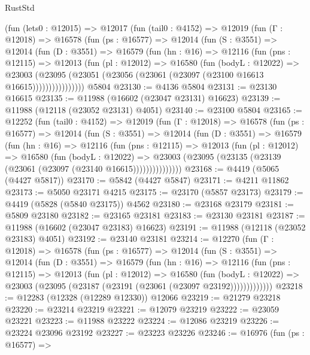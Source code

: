 \begin{lexlean}{RustStd}
\begin{coremodule}
    (fun (lets0 : @12015) =>
    @12017
      (fun (tail0 : @4152) =>
      @12019
        (fun (Γ : @12018) =>
        @16578
          (fun (ps : @16577) =>
          @12014
            (fun (S : @3551) =>
            @12014
              (fun (D : @3551) =>
              @16579
                (fun (hn : @16) =>
                @12116
                  (fun (pns : @12115) =>
                  @12013
                    (fun (pl : @12012) =>
                    @16580
                      (fun (bodyL : @12022) =>
                      @23003
                        (@23095
                          (@23051 (@23056 (@23061 (@23097 (@23100 @16613 @16615))))))))))))))))
    @5804
@23130 := @4136 @5804
@23131 := @23130 @16615
@23135 := @11988 (@16602 (@23047 @23131) @16623)
@23139 := @11988 (@12118 (@23052 @23131) @4051)
@23140 := @23100 @5804
@23165 := @12252
    (fun (tail0 : @4152) =>
    @12019
      (fun (Γ : @12018) =>
      @16578
        (fun (ps : @16577) =>
        @12014
          (fun (S : @3551) =>
          @12014
            (fun (D : @3551) =>
            @16579
              (fun (hn : @16) =>
              @12116
                (fun (pns : @12115) =>
                @12013
                  (fun (pl : @12012) =>
                  @16580
                    (fun (bodyL : @12022) =>
                    @23003 (@23095 (@23135 (@23139 (@23061 (@23097 (@23140 @16615)))))))))))))))
@23168 := @4419 (@5065 (@4427 @5817))
@23170 := @5842 (@4427 @5847)
@23171 := @4211 @11862
@23173 := @5050 @23171 @4215
@23175 := @23170 (@5857 @23173)
@23179 := @4419 (@5828 (@5840 @23175)) @4562
@23180 := @23168 @23179
@23181 := @5809 @23180
@23182 := @23165 @23181
@23183 := @23130 @23181
@23187 := @11988 (@16602 (@23047 @23183) @16623)
@23191 := @11988 (@12118 (@23052 @23183) @4051)
@23192 := @23140 @23181
@23214 := @12270
    (fun (Γ : @12018) =>
    @16578
      (fun (ps : @16577) =>
      @12014
        (fun (S : @3551) =>
        @12014
          (fun (D : @3551) =>
          @16579
            (fun (hn : @16) =>
            @12116
              (fun (pns : @12115) =>
              @12013
                (fun (pl : @12012) =>
                @16580
                  (fun (bodyL : @12022) =>
                  @23003 (@23095 (@23187 (@23191 (@23061 (@23097 @23192)))))))))))))
@23218 := @12283 (@12328 (@12289 @12330)) @12066
@23219 := @21279 @23218
@23220 := @23214 @23219
@23221 := @12079 @23219
@23222 := @23059 @23221
@23223 := @11988 @23222
@23224 := @12086 @23219
@23226 := @23224 @23096 @23192
@23227 := @23223 @23226
@23246 := @16976
    (fun (ps : @16577) =>

\end{coremodule}
\end{lexlean}
